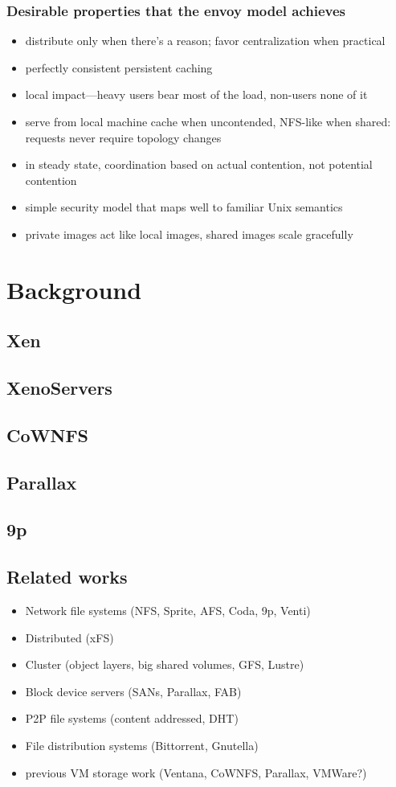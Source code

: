 \documentclass[a4paper]{article}
\begin{document}
\subsubsection{Desirable properties that the envoy model achieves}
\begin{itemize}
\item distribute only when there's a reason; favor centralization when practical
\item perfectly consistent persistent caching
\item local impact---heavy users bear most of the load, non-users none of it
\item serve from local machine cache when uncontended, NFS-like when shared: requests never require topology changes
\item in steady state, coordination based on actual contention, not potential contention
\item simple security model that maps well to familiar Unix semantics
\item private images act like local images, shared images scale gracefully
\end{itemize}


\section{Background}

\subsection{Xen}
\subsection{XenoServers}
\subsection{CoWNFS}
\subsection{Parallax}
\subsection{9p}
\subsection{Related works}
\begin{itemize}
\item Network file systems (NFS, Sprite, AFS, Coda, 9p, Venti)
\item Distributed (xFS)
\item Cluster (object layers, big shared volumes, GFS, Lustre)
\item Block device servers (SANs, Parallax, FAB)
\item P2P file systems (content addressed, DHT)
\item File distribution systems (Bittorrent, Gnutella)
\item previous VM storage work (Ventana, CoWNFS, Parallax, VMWare?)
\end{itemize}
\end{document}
